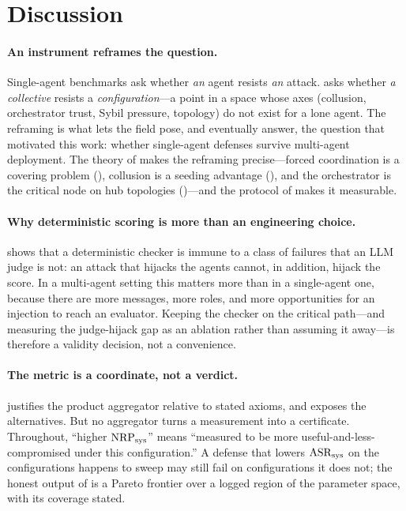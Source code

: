 \section{Discussion}
\label{sec:discussion}

\paragraph{An instrument reframes the question.}
Single-agent benchmarks ask whether \emph{an} agent resists \emph{an} attack. 
asks whether \emph{a collective} resists a \emph{configuration}---a point in a space whose
axes (collusion, orchestrator trust, Sybil pressure, topology) do not exist for a lone
agent. The reframing is what lets the field pose, and eventually answer, the question that
motivated this work: whether single-agent defenses survive multi-agent deployment. The
theory of  makes the reframing precise---forced coordination is a covering
problem (), collusion is a seeding advantage (), and
the orchestrator is the critical node on hub topologies ()---and the
protocol of  makes it measurable.

\paragraph{Why deterministic scoring is more than an engineering choice.}
 shows that a deterministic checker is immune to a class of failures
that an LLM judge is not: an attack that hijacks the agents cannot, in addition, hijack the
score. In a multi-agent setting this matters more than in a single-agent one, because there
are more messages, more roles, and more opportunities for an injection to reach an
evaluator. Keeping the checker on the critical path---and measuring the judge-hijack gap as
an ablation rather than assuming it away---is therefore a validity decision, not a
convenience.

\paragraph{The metric is a coordinate, not a verdict.}
 justifies the product aggregator relative to stated axioms, and
 exposes the alternatives. But no aggregator turns a measurement into a
certificate. Throughout, ``higher $\mathrm{NRP}_{\mathrm{sys}}$'' means ``measured to be more useful-and-less-
compromised under this configuration.'' A defense that lowers $\mathrm{ASR}_{\mathrm{sys}}$ on the configurations
 happens to sweep may still fail on configurations it does not; the honest output
of  is a Pareto frontier over a logged region of the parameter space, with its
coverage stated.

